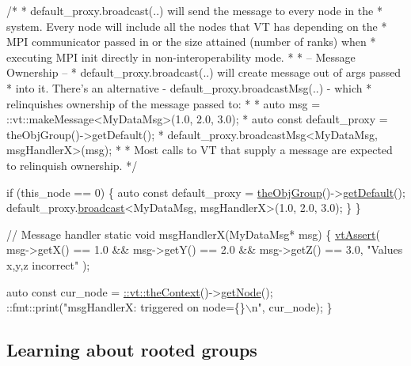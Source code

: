 \begin{DoxyCodeInclude}
  \textcolor{comment}{/*}
\textcolor{comment}{   * default\_proxy.broadcast(..) will send the message to every node in the}
\textcolor{comment}{   * system. Every node will include all the nodes that VT has depending on the}
\textcolor{comment}{   * MPI communicator passed in or the size attained (number of ranks) when}
\textcolor{comment}{   * executing MPI init directly in non-interoperability mode.}
\textcolor{comment}{   *}
\textcolor{comment}{   * -- Message Ownership --}
\textcolor{comment}{   * default\_proxy.broadcast(..) will create message out of args passed}
\textcolor{comment}{   * into it. There's an alternative - default\_proxy.broadcastMsg(..) - which}
\textcolor{comment}{   * relinquishes ownership of the message passed to:}
\textcolor{comment}{   *}
\textcolor{comment}{   *   auto msg = ::vt::makeMessage<MyDataMsg>(1.0, 2.0, 3.0);}
\textcolor{comment}{   *   auto const default\_proxy = theObjGroup()->getDefault();}
\textcolor{comment}{   *   default\_proxy.broadcastMsg<MyDataMsg, msgHandlerX>(msg);}
\textcolor{comment}{   *}
\textcolor{comment}{   *  Most calls to VT that supply a message are expected to relinquish ownership.}
\textcolor{comment}{   */}

  \textcolor{keywordflow}{if} (this\_node == 0) \{
    \textcolor{keyword}{auto} \textcolor{keyword}{const} default\_proxy = \hyperlink{namespacevt_a833f0115b692f578167cbd88e30d39c5}{theObjGroup}()->\hyperlink{structvt_1_1objgroup_1_1_obj_group_manager_a4447b8f4881710bc7b0b7a37de9d10b9}{getDefault}();
    default\_proxy.\hyperlink{structvt_1_1objgroup_1_1proxy_1_1_proxy_3_01void_01_4_a13f8d6751a246a449e7d13ae7eed3541}{broadcast}<MyDataMsg, msgHandlerX>(1.0, 2.0, 3.0);
  \}
\}

\textcolor{comment}{// Message handler}
\textcolor{keyword}{static} \textcolor{keywordtype}{void} msgHandlerX(MyDataMsg* msg) \{
  \hyperlink{config__assert_8h_aeddd4990a496e91a0ca5d6c16437359b}{vtAssert}(
    msg->getX() == 1.0 && msg->getY() == 2.0 && msg->getZ() == 3.0,
    \textcolor{stringliteral}{"Values x,y,z incorrect"}
  );

  \textcolor{keyword}{auto} \textcolor{keyword}{const} cur\_node = \hyperlink{namespacevt_a26551fe0e6e6a1371111df5b12c7e92c}{::vt::theContext}()->\hyperlink{structvt_1_1ctx_1_1_context_a0d52c263ce8516546a67443d9a86fa5f}{getNode}();
  ::fmt::print(\textcolor{stringliteral}{"msgHandlerX: triggered on node=\{\}\(\backslash\)n"}, cur\_node);
\}
\end{DoxyCodeInclude}
\hypertarget{tutorial-1e}{}\subsection{Learning about rooted groups}\label{tutorial-1e}

